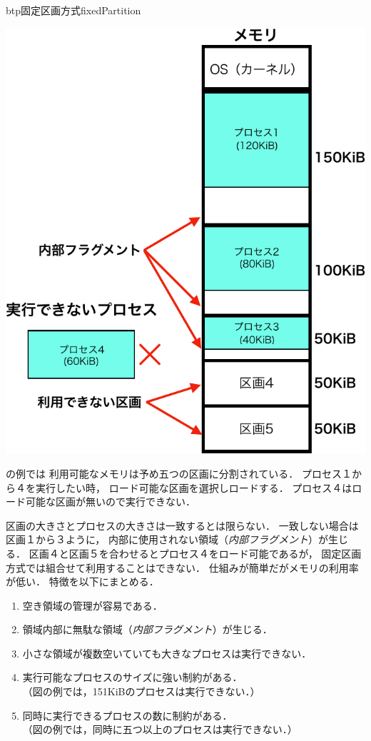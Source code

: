 \begin{myfig}{btp}{固定区画方式}{fixedPartition}
\begin{minipage}{0.49\columnwidth}
\begin{center}
      \includegraphics[scale=0.6]{Fig/fixedPartitionExec-crop.pdf}
      \label{fig:fixedParthtionB}
    \end{center}
  \end{minipage}
\end{myfig}

の例では
利用可能なメモリは予め五つの区画に分割されている．
プロセス１から４を実行したい時，
ロード可能な区画を選択しロードする．
プロセス４はロード可能な区画が無いので実行できない．

区画の大きさとプロセスの大きさは一致するとは限らない．
一致しない場合は区画１から３ように，
内部に使用されない領域（\emph{内部フラグメント}）が生じる．
区画４と区画５を合わせるとプロセス４をロード可能であるが，
固定区画方式では組合せて利用することはできない．
仕組みが簡単だがメモリの利用率が低い．
特徴を以下にまとめる．

\begin{enumerate}
\item 空き領域の管理が容易である．
\item 領域内部に無駄な領域（\emph{内部フラグメント}）が生じる．
\item 小さな領域が複数空いていても大きなプロセスは実行できない．
\item 実行可能なプロセスのサイズに強い制約がある．\\
  （図の例では，151KiBのプロセスは実行できない．）
\item 同時に実行できるプロセスの数に制約がある．\\
  （図の例では，同時に五つ以上のプロセスは実行できない．）
\end{enumerate}

